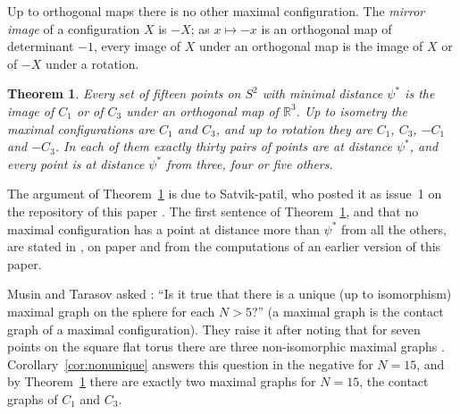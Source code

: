 \documentclass[12pt]{amsart}
\newtheorem{theorem}{Theorem}[section]
\theoremstyle{definition}
\theoremstyle{plain}
\theoremstyle{definition}
\newcommand{\R}{\mathbb{R}}
\newcommand{\Sph}{S^2}
\newcommand{\psis}{\psi^{*}}
\newcommand{\CI}{C_1}
\newcommand{\CIII}{C_3}
\newcommand{\leanmap}[1]{\ignorespaces}
\newcommand{\mapnote}[1]{\ignorespaces}
\begin{document}
Up to orthogonal maps there is no other maximal configuration. The \emph{mirror image} of a configuration $X$ is $-X$; as $x\mapsto-x$ is an orthogonal map of determinant $-1$, every image of $X$ under an orthogonal map is the image of $X$ or of $-X$ under a rotation.

\begin{theorem}\label{thm:classif}\leanmap{Tammes15.classification_of_enum_progTreesDom, Tammes15.classification_of_enum_killed, Tammes15.classification_count_of_enum_progTreesDom, Tammes15.classification_count_of_enum_killed}\mapnote{for fifteen labelled unit vectors at pairwise angle at least $\arccos u$, up to relabelling: the first sentence as the image of $C_1$ or $C_3$ under a linear isometry of $\mathbb{R}^3$ (first and second declarations); the classes up to rotation, with the rotations as the linear isometries of determinant $1$, as the third and fourth: every such configuration is $sRC_1$ or $sRC_3$ with $s=\pm1$ and $R$ a rotation, each of $\pm C_1$, $\pm C_3$ is one, and no rotation maps one of the four onto another; with Corollary \ref{cor:nonunique} this gives the two classes up to isometry; the last sentence, with distance $\psi^*$ as angle $\arccos u$, also as the third and fourth, which add that the contact graph at $u$ is isomorphic to that of $C_1$ or of $C_3$ and that these two are not isomorphic; the first and third declarations from the hypotheses of Theorem \ref{thm:trees}, the second and fourth from D2 and D3 (Definitions \ref{def:dtwo} and \ref{def:dthree})}
Every set of fifteen points on $\Sph$ with minimal distance $\psis$ is the image of $\CI$ or of $\CIII$ under an orthogonal map of $\R^3$. Up to isometry the maximal configurations are $\CI$ and $\CIII$, and up to rotation they are $\CI$, $\CIII$, $-\CI$ and $-\CIII$. In each of them exactly thirty pairs of points are at distance $\psis$, and every point is at distance $\psis$ from three, four or five others.
\end{theorem}

The argument of Theorem~\ref{thm:classif} is due to Satvik-patil, who posted it as issue~1 on the repository of this paper \cite{Rep}. The first sentence of Theorem~\ref{thm:classif}, and that no maximal configuration has a point at distance more than $\psis$ from all the others, are stated in \cite[Remark~2]{Kep}, on paper and from the computations of an earlier version of this paper.

Musin and Tarasov asked \cite[Section~6, Question~2]{MTsurvey}: ``Is it true that there is a unique (up to isomorphism) maximal graph on the sphere for each $N>5$?'' (a maximal graph is the contact graph of a maximal configuration). They raise it after noting that for seven points on the square flat torus there are three non-isomorphic maximal graphs \cite{MN}. Corollary~\ref{cor:nonunique} answers this question in the negative for $N=15$, and by Theorem~\ref{thm:classif} there are exactly two maximal graphs for $N=15$, the contact graphs of $\CI$ and $\CIII$.
\end{document}

